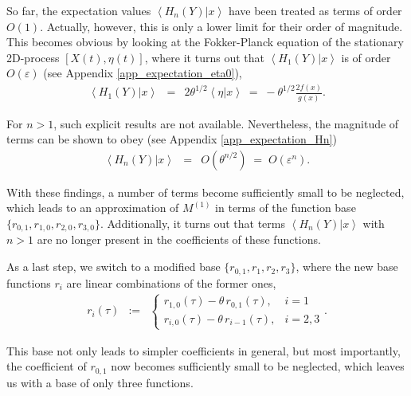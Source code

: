\documentclass[aps,twocolumn,superscriptaddress,showpacs,showkeys]{revtex4}
\newcommand{\eps}{\varepsilon}
\begin{document}
So far, the expectation values $\left<H_n(Y)|x\right>$ have been treated as terms of order $O(1)$. Actually, however,
this is only a lower limit for their order of magnitude. This becomes obvious by looking at the Fokker-Planck equation
of the stationary 2D-process $[X(t),\eta(t)]$, where it turns out that $\left<H_1(Y)|x\right>$ is of order $O(\eps)$
(see Appendix \ref{app_expectation_eta0}),
%
\begin{eqnarray}\label{mean_H1}
\left<H_1(Y)|x\right> &=& 2\theta^{1/2}\left<\eta|x\right> \;=\; -\theta^{1/2}\frac{2f(x)}{g(x)}.
\end{eqnarray}

\noindent For $n>1$, such explicit results are not available. Nevertheless, the magnitude of terms can be shown to obey
(see Appendix \ref{app_expectation_Hn})
%
\begin{eqnarray}\label{mean_Hn}
\left<H_n(Y)|x\right> &=& O(\theta^{n/2})\;=\;O(\eps^n).
\end{eqnarray}

\noindent With these findings, a number of terms become sufficiently small to be neglected, which leads to an approximation of
$M^{(1)}$ in terms of the function base $\{r_{0,1},r_{1,0},r_{2,0},r_{3,0}\}$.
Additionally, it turns out that terms $\left<H_n(Y)|x\right>$ with $n>1$ are no longer present in the coefficients of these
functions.

As a last step, we switch to a modified base $\{r_{0,1},r_1,r_2,r_3\}$, where the new base functions $r_i$
are linear combinations of the former ones,
%
\begin{eqnarray}
r_i(\tau) &:=&
\left\{\begin{array}{ll}
  r_{1,0}(\tau) - \theta\, r_{0,1}(\tau)  ,& i=1\\[.3em]
  r_{i,0}(\tau) - \theta\, r_{i-1}(\tau)  ,& i=2,3 
\end{array}\right. .
\end{eqnarray}

\noindent This base not only leads to simpler coefficients in general, but most importantly, the coefficient of
$r_{0,1}$ now becomes sufficiently small to be neglected, which leaves us with a base of only three functions.
\end{document}
